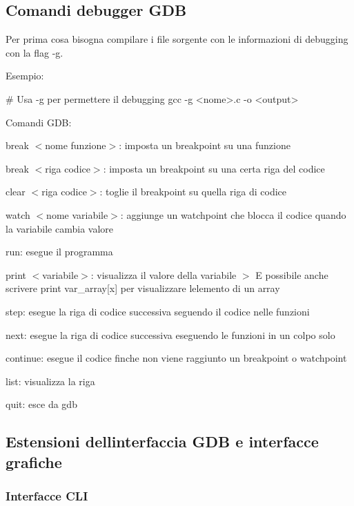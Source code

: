 \subsection*{Comandi debugger G\+DB}

Per prima cosa bisogna compilare i file sorgente con le informazioni di debugging con la flag {\ttfamily -\/g}.

Esempio\+: 
\begin{DoxyCode}
# Usa -g per permettere il debugging
gcc -g <nome>.c -o <output>
\end{DoxyCode}


Comandi G\+DB\+:
\begin{DoxyItemize}
\item {\ttfamily break $<$nome funzione$>$}\+: imposta un breakpoint su una funzione
\item {\ttfamily break $<$riga codice$>$}\+: imposta un breakpoint su una certa riga del codice
\item {\ttfamily clear $<$riga codice$>$}\+: toglie il breakpoint su quella riga di codice
\item {\ttfamily watch $<$nome variabile$>$}\+: aggiunge un watchpoint che blocca il codice quando la variabile cambia valore
\item {\ttfamily run}\+: esegue il programma
\item {\ttfamily print $<$variabile$>$}\+: visualizza il valore della variabile $>$ E\textquotesingle{} possibile anche scrivere print var\+\_\+array\mbox{[}x\mbox{]} per visualizzare l\textquotesingle{}elemento di un array
\item {\ttfamily step}\+: esegue la riga di codice successiva seguendo il codice nelle funzioni
\item {\ttfamily next}\+: esegue la riga di codice successiva eseguendo le funzioni in un colpo solo
\item {\ttfamily continue}\+: esegue il codice finche\textquotesingle{} non viene raggiunto un breakpoint o watchpoint
\item {\ttfamily list}\+: visualizza la riga
\item {\ttfamily quit}\+: esce da gdb
\end{DoxyItemize}

\subsection*{Estensioni dell\textquotesingle{}interfaccia G\+DB e interfacce grafiche}

\subsubsection*{Interfacce C\+LI}


